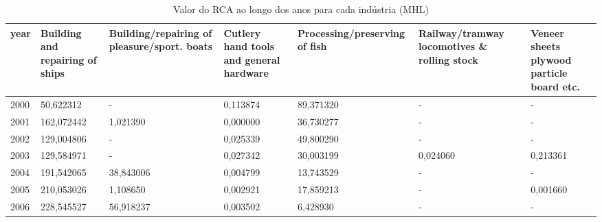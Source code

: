 \begin{table}
\centering
\caption{Valor do RCA ao longo dos anos para cada indústria (MHL)}
\begin{tabular}{p{1cm}p{2cm}p{2cm}p{2cm}p{2cm}p{2cm}p{2cm}}
\toprule
 year &  Building and repairing of ships &  Building/repairing of pleasure/sport. boats &  Cutlery hand tools and general hardware &  Processing/preserving of fish &  Railway/tramway locomotives \& rolling stock &  Veneer sheets plywood particle board etc. \\
\midrule
 2000 &                        50,622312 &                                            - &                                 0,113874 &                      89,371320 &                                            - &                                          - \\
 2001 &                       162,072442 &                                     1,021390 &                                 0,000000 &                      36,730277 &                                            - &                                          - \\
 2002 &                       129,004806 &                                            - &                                 0,025339 &                      49,800290 &                                            - &                                          - \\
 2003 &                       129,584971 &                                            - &                                 0,027342 &                      30,003199 &                                     0,024060 &                                   0,213361 \\
 2004 &                       191,542065 &                                    38,843006 &                                 0,004799 &                      13,743529 &                                            - &                                          - \\
 2005 &                       210,053026 &                                     1,108650 &                                 0,002921 &                      17,859213 &                                            - &                                   0,001660 \\
 2006 &                       228,545527 &                                    56,918237 &                                 0,003502 &                       6,428930 &                                            - &                                          - \\

\end{tabular}
\end{table}
